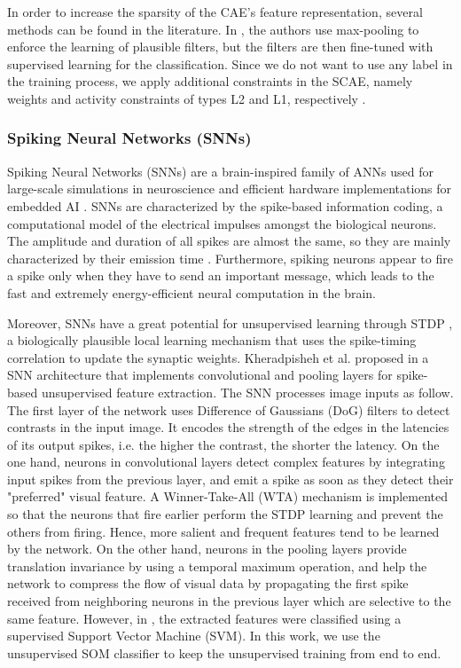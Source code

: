 \documentclass[runningheads]{llncs}
\begin{document}
In order to increase the sparsity of the CAE's feature representation, several methods can be found in the literature. In \cite{masci2011stacked_cae}, the authors use max-pooling to enforce the learning of plausible filters, but the filters are then fine-tuned with supervised learning for the classification. Since we do not want to use any label in the training process, we apply additional constraints in the SCAE, namely weights and activity constraints of types L2 and L1, respectively \cite{jiang2015sparse_penalties}.

\subsubsection{Spiking Neural Networks (SNNs)}
Spiking Neural Networks (SNNs) are a brain-inspired family of ANNs used for large-scale simulations in neuroscience \cite{furber2014spinnaker} and efficient hardware implementations for embedded AI \cite{davies2018loihi}. SNNs are characterized by the spike-based information coding, a computational model of the electrical impulses amongst the biological neurons. The amplitude and duration of all spikes are almost the same, so they are mainly characterized by their emission time \cite{kheradpisheh2018stdp_cnn}. Furthermore, spiking neurons appear to fire a spike only when they have to send an important message, which leads to the fast and extremely energy-efficient neural computation in the brain.

Moreover, SNNs have a great potential for unsupervised learning through STDP \cite{diehl2015stdp}, a biologically plausible local learning mechanism that uses the spike-timing correlation to update the synaptic weights. Kheradpisheh et al. proposed in \cite{kheradpisheh2018stdp_cnn} a SNN architecture that implements convolutional and pooling layers for spike-based unsupervised feature extraction. 
The SNN processes image inputs as follow.
The first layer of the network uses Difference of Gaussians (DoG) filters to detect contrasts in the input image. It encodes the strength of the edges in the latencies of its output spikes, i.e. the higher the contrast, the shorter the latency. 
On the one hand, neurons in convolutional layers detect complex features by integrating input spikes from the previous layer, and emit a spike as soon as they detect their "preferred" visual feature. A Winner-Take-All (WTA) mechanism is implemented so that the neurons that fire earlier perform the STDP learning and prevent the others from firing. Hence, more salient and frequent features tend to be learned by the network. 
On the other hand, neurons in the pooling layers provide translation invariance by using a temporal maximum operation, and help the network to compress the flow of visual data by propagating the first spike received from neighboring neurons in the previous layer which are selective to the same feature.
However, in \cite{kheradpisheh2018stdp_cnn}, the extracted features were classified using a supervised Support Vector Machine (SVM). In this work, we use the unsupervised SOM classifier to keep the unsupervised training from end to end.
\end{document}
